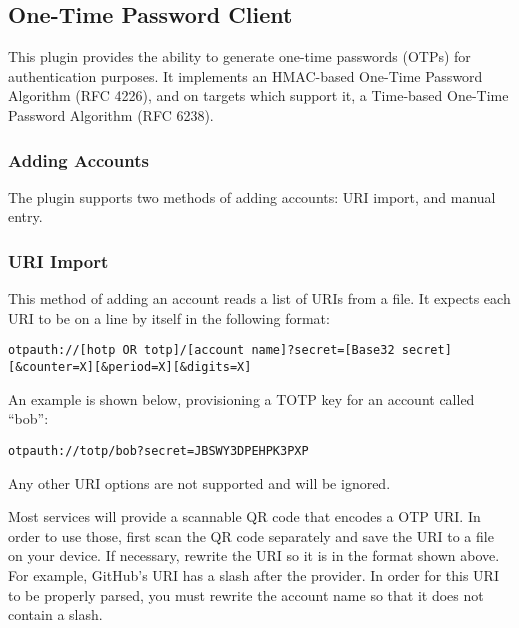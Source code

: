 \subsection{One-Time Password Client}
This plugin provides the ability to generate one-time passwords (OTPs)
for authentication purposes. It implements an HMAC-based One-Time
Password Algorithm (RFC 4226), and on targets which support it, a
Time-based One-Time Password Algorithm (RFC 6238).

\subsubsection{Adding Accounts}
The plugin supports two methods of adding accounts: URI import, and
manual entry.


\subsubsection{URI Import}
This method of adding an account reads a list of URIs from a file. It
expects each URI to be on a line by itself in the following format:

\begin{verbatim}
otpauth://[hotp OR totp]/[account name]?secret=[Base32 secret][&counter=X][&period=X][&digits=X]
\end{verbatim}

An example is shown below, provisioning a TOTP key for an account called ``bob'':

\begin{verbatim}
otpauth://totp/bob?secret=JBSWY3DPEHPK3PXP
\end{verbatim}

Any other URI options are not supported and will be ignored.

Most services will provide a scannable QR code that encodes a OTP
URI. In order to use those, first scan the QR code separately and save
the URI to a file on your device. If necessary, rewrite the URI so it
is in the format shown above. For example, GitHub's URI has a slash
after the provider. In order for this URI to be properly parsed, you
must rewrite the account name so that it does not contain a slash.

